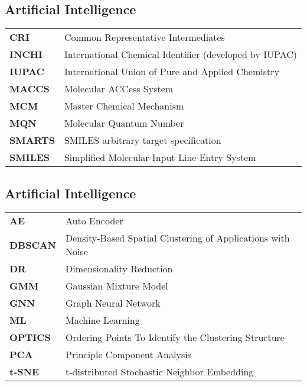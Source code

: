 \subsection*{Artificial Intelligence}
 \begin{center}
  \begin{tabular}{ p{}p{} }
        \textbf{CRI } &  Common Representative Intermediates\\
\textbf{INCHI } &  International Chemical Identifier (developed by IUPAC)\\
\textbf{IUPAC } &   International Union of Pure and Applied Chemistry\\
\textbf{MACCS } &  Molecular ACCess System\\
\textbf{MCM } &  Master Chemical Mechanism\\
\textbf{MQN } &  Molecular Quantum Number\\
\textbf{SMARTS } &  SMILES arbitrary target specification\\
\textbf{SMILES } &  Simplified Molecular-Input Line-Entry System\\
  \end{tabular}
 \end{center}

\subsection*{Artificial Intelligence}
 \begin{center}
  \begin{tabular}{ p{}p{} }
        \textbf{AE } &  Auto Encoder\\
\textbf{DBSCAN } &  Density-Based Spatial Clustering of Applications with Noise\\
\textbf{DR } &  Dimensionality Reduction\\
\textbf{GMM } &  Gaussian Mixture Model\\
\textbf{GNN } &  Graph Neural Network\\
\textbf{ML } &  Machine Learning\\
\textbf{OPTICS } &  Ordering Points To Identify the Clustering Structure\\
\textbf{PCA } &  Principle Component Analysis\\
\textbf{t-SNE } &  t-distributed Stochastic Neighbor Embedding\\
  \end{tabular}
 \end{center}
